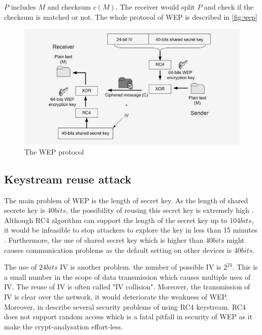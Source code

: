 	
$P$ includes $M$ and checksum $c(M)$. The receiver would split $P$ and check if the checksum is matched or not. The whole protocol of \ac{WEP} is described in \autoref{fig:wep}
\begin{figure}
	\includegraphics[scale=0.35]{images/wep.png}
	\caption{The WEP protocol \cite{al2006ieee}}
	\label{fig:wep}
\end{figure}

\subsection{Keystream reuse attack} \label{subsec:keystream_reuse}

The main problem of \ac{WEP} is the length of secret key. As the length of shared secrete key is $40bits$, the possibility of reusing this secret key is extremely high \cite{al2006ieee}. Although \ac{RC4} algorithm can support the length of the secret key up to $104bits$, it would be infeasible to stop attackers to explore the key in less than 15 minutes \cite{convery2003cisco}. Furthermore, the use of shared secret key which is higher than $40bits$ might causes communication problems as the default setting on other devices is $40bits$. 

The use of $24bits$ \ac{IV} is another problem. the number of possible \ac{IV} is $2^{24}$. This is a small number in the scope of data transmission which causes multiple uses of \ac{IV}. The reuse of \ac{IV} is often called "\ac{IV} collision". Moreover, the transmission of \ac{IV} is clear over the network, it would deteriorate the weakness of \ac{WEP}. Moreover, \citeauthor{shunman2003wlan} in \cite{shunman2003wlan} describe several security problems of using \ac{RC4} keystream. \ac{RC4} does not support random access which is a fatal pitfall in security of \ac{WEP} as it make the crypt-analysation effort-less.


